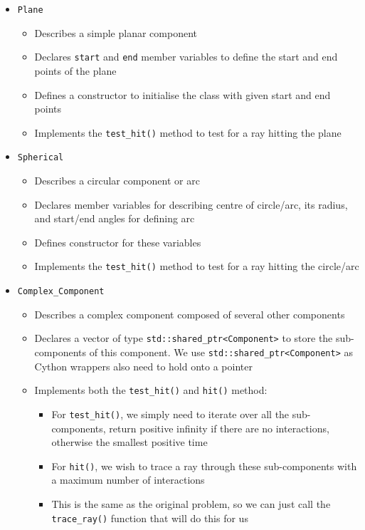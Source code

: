 \documentclass{article}
\begin{document}
\begin{itemize}
    \item \texttt{Plane}
    \begin{itemize}
        \item Describes a simple planar component
        \item Declares \texttt{start} and \texttt{end} member variables to define the start and end points of the plane
        \item Defines a constructor to initialise the class with given start and end points
        \item Implements the \texttt{test\_hit()} method to test for a ray hitting the plane
    \end{itemize}
    \item \texttt{Spherical}
    \begin{itemize}
        \item Describes a circular component or arc
        \item Declares member variables for describing centre of circle/arc, its radius, and start/end angles for defining arc
        \item Defines constructor for these variables
        \item Implements the \texttt{test\_hit()} method to test for a ray hitting the circle/arc
    \end{itemize}
    \item \texttt{Complex\_Component}
    \begin{itemize}
        \item Describes a complex component composed of several other components
        \item Declares a vector of type \texttt{std::shared\_ptr<Component>} to store the sub-components of this component. We use \texttt{std::shared\_ptr<Component>} as Cython wrappers also need to hold onto a pointer
        \item Implements both the \texttt{test\_hit()} and \texttt{hit()} method:
        \begin{itemize}
            \item For \texttt{test\_hit()}, we simply need to iterate over all the sub-components, return positive infinity if there are no interactions, otherwise the smallest positive time
            \item For \texttt{hit()}, we wish to trace a ray through these sub-components with a maximum number of interactions
            \item This is the same as the original problem, so we can just call the \texttt{trace\_ray()} function that will do this for us
        \end{itemize}
    \end{itemize}
\end{itemize}
\end{document}
